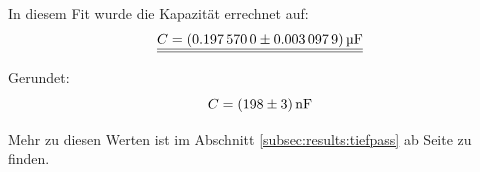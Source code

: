 In diesem Fit wurde die Kapazit\"at errechnet auf:
\begin{equation*}
    \underline{\underline{C = \SI[separate-uncertainty = true]{0.19757 \pm 0.0030979}{\micro\farad}}}
\end{equation*}

Gerundet:
\begin{equation*}
    C = \SI[separate-uncertainty = true]{198 \pm 3}{\nano\farad}
\end{equation*}

Mehr zu diesen Werten ist  im Abschnitt \ref{subsec:results:tiefpass} ab Seite
\pageref{subsec:results:tiefpass} zu finden.
